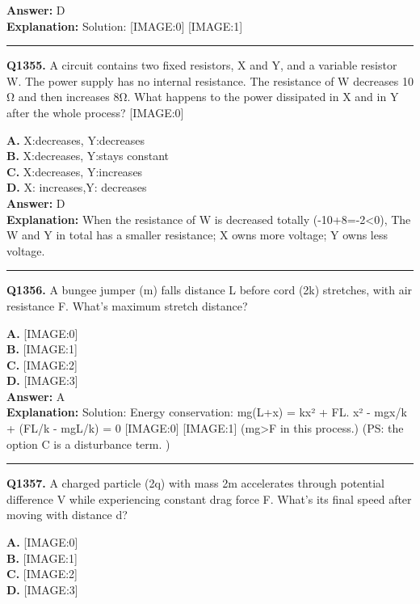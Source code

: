 \documentclass[12pt]{article}
\begin{document}
\textbf{Answer:} D \\
\textbf{Explanation:} Solution:
[IMAGE:0]
[IMAGE:1]

\hrule
\vspace{1em}


\noindent
\textbf{Q1355.} A circuit contains two fixed resistors, X and Y, and a variable resistor W. The power supply has no internal resistance.
The resistance of W decreases 10 Ω and then increases 8Ω. What happens to the power dissipated in X and in Y after the whole process?
[IMAGE:0]



\textbf{A.} X:decreases, Y:decreases \\
\textbf{B.} X:decreases, Y:stays constant \\
\textbf{C.} X:decreases, Y:increases \\
\textbf{D.} X: increases,Y: decreases \\

\textbf{Answer:} D \\
\textbf{Explanation:} When the resistance of W is decreased totally (-10+8=-2<0), The W and Y in total has a smaller resistance; X owns more voltage; Y owns less voltage.

\hrule
\vspace{1em}


\noindent
\textbf{Q1356.} A bungee jumper (m) falls distance L before cord (2k) stretches, with air resistance F. What's maximum stretch distance?



\textbf{A.} [IMAGE:0] \\
\textbf{B.} [IMAGE:1] \\
\textbf{C.} [IMAGE:2] \\
\textbf{D.} [IMAGE:3] \\

\textbf{Answer:} A \\
\textbf{Explanation:} Solution: Energy conservation: mg(L+x) = kx² + FL.
x² - mgx/k + (FL/k - mgL/k) = 0
[IMAGE:0]
[IMAGE:1]
(mg>F in this process.)
(PS: the option C is a disturbance term. )

\hrule
\vspace{1em}


\noindent
\textbf{Q1357.} A charged particle (2q) with mass 2m accelerates through potential difference V while experiencing constant drag force F. What's its final speed after moving with distance d?



\textbf{A.} [IMAGE:0] \\
\textbf{B.} [IMAGE:1] \\
\textbf{C.} [IMAGE:2] \\
\textbf{D.} [IMAGE:3] \\
\end{document}
